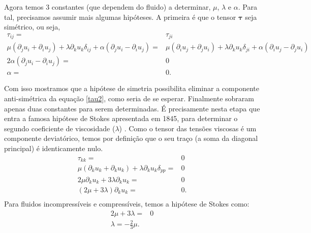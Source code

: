 Agora temos 3 constantes (que dependem do fluido) a determinar, $\mu$, $\lambda$ e $\alpha$. Para tal, precisamos assumir mais algumas hipóteses. A primeira é que o tensor $\boldsymbol{\tau}$ seja simétrico, ou seja,
\begin{equation}\label{tau3}
\begin{split}
\tau_{ij} = & \tau_{ji}\\
\mu\left(\partial_{j}u_{i} + \partial_{i}u_{j}\right) + \lambda\partial_{k}u_{k}\delta_{ij} + \alpha\left(\partial_{j}u_{i} - \partial_{i}u_{j}\right) = &\mu\left(\partial_{i}u_{j} + \partial_{j}u_{i}\right) + \lambda\partial_{k}u_{k}\delta_{ji} + \alpha\left(\partial_{i}u_{j} - \partial_{j}u_{i}\right)\\
2\alpha\left(\partial_{j}u_{i} - \partial_{i}u_{j}\right)=&0\\
\alpha = &0.
\end{split}
\end{equation}

Com isso mostramos que a hipótese de simetria possibilita eliminar a componente anti-simétrica da equação \ref{tau2}, como seria de se esperar. Finalmente sobraram apenas duas constantes para serem determinadas. É precisamente nesta etapa que entra a famosa hipótese de Stokes apresentada em 1845, para determinar o segundo coeficiente de viscosidade ($\lambda$) \cite{stokes2007theories}. Como o tensor das tensões viscosas é um componente deviatórico, temos por definição que o seu traço (a soma da diagonal principal) é identicamente nulo.
\begin{equation}\label{tau_semifinal}
\begin{split}
\tau_{kk} = & 0\\
\mu\left(\partial_{k}u_{k} + \partial_{k}u_{k}\right) + \lambda\partial_{k}u_{k}\delta_{pp}  = &0\\
2\mu\partial_{k}u_{k} + 3\lambda\partial_{k}u_{k}= &0\\
\left(2\mu + 3\lambda\right)\partial_{k}u_{k}= &0.\\
\end{split}
\end{equation}
Para fluidos incompressíveis e compressíveis, temos a hipótese de Stokes como:
\begin{equation}\label{stokes_hypotesy}
\begin{split}
2\mu + 3\lambda= &0\\
\lambda = -\frac{2}{3}\mu.
\end{split}
\end{equation}

